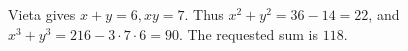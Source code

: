 Vieta gives $x+y=6,xy=7$. Thus $x^2+y^2=36-14=22$, and $x^3+y^3=216-3\cdot7\cdot6=90$. The requested sum is $\boxed{118}$.
